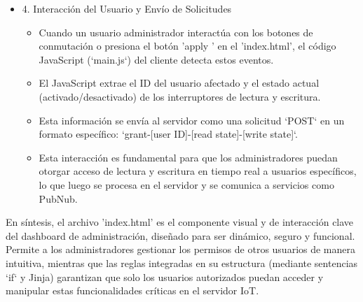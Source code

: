 \documentclass{report}
\begin{document}
\begin{itemize}
    \item 4. Interacción del Usuario y Envío de Solicitudes
    \begin{itemize}
        \item Cuando un usuario administrador interactúa con los botones de conmutación o presiona el botón  'apply ' en el 'index.html', el 
        código  JavaScript (`main.js`)  del cliente detecta estos eventos.
        \item El JavaScript extrae el ID del usuario afectado y el estado actual (activado/desactivado) de los interruptores de lectura y 
        escritura.
        \item Esta información se envía al servidor como una  solicitud `POST`  en un formato específico: 
        `grant-[user ID]-[read state]-[write state]`.
        \item Esta interacción es fundamental para que los administradores puedan  otorgar acceso de lectura y escritura en tiempo real  a 
        usuarios específicos, lo que luego se procesa en el servidor y se comunica a servicios como PubNub.
    \end{itemize}
\end{itemize}

En síntesis, el archivo 'index.html' es el componente visual y de interacción clave del dashboard de administración, diseñado para ser dinámico, 
seguro y funcional. Permite a los administradores gestionar los permisos de otros usuarios de manera intuitiva, mientras que las reglas integradas 
en su estructura (mediante sentencias `if` y Jinja) garantizan que solo los usuarios autorizados puedan acceder y manipular estas funcionalidades 
críticas en el servidor IoT.
\end{document}
